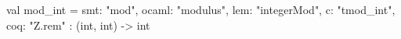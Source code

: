 val mod_int = {
  smt: "mod",
  ocaml: "modulus",
  lem: "integerMod",
  c: "tmod_int",
  coq: "Z.rem"
} : (int, int) -> int

